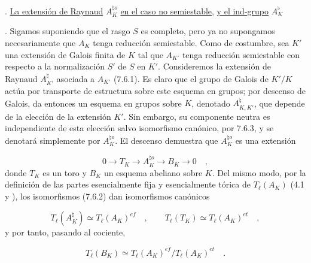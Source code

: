 
\medskip
{}. \underline{La extensión de Raynaud} $A_K^{\natural o}$ \underline{en el caso no
semiestable}, \underline{y el ind-grupo} $A_K^{\flat}$

\medskip
{}. Sigamos suponiendo que el rasgo $S$ es completo, pero ya no
supongamos necesariamente que $A_K$ tenga reducción semiestable. Como
de costumbre, sea $K'$ una extensión de Galois finita de $K$ tal que
$A_{K'}$ tenga reducción semiestable con respecto a la normalización
$S'$ de $S$ en $K'$. Consideremos la extensión de Raynaud
$A_{K'}^{\natural}$ asociada a $A_{K'}$ (7.6.1). Es claro que el grupo
de Galois de $K'/K$ actúa por transporte de estructura sobre este
esquema en grupos; por descenso de Galois, da entonces un esquema en
grupos sobre $K$, denotado $A_{K,K'}^{\natural}$, que depende de la
elección de la extensión $K'$. Sin embargo, su componente neutra es
independiente de esta elección salvo isomorfismo canónico, por 7.6.3, y
se denotará simplemente por $A_K^{\natural o}$. El descenso demuestra
que $A_K^{\natural o}$ es una extensión

\begin{equation}\tag{8.1.1}
0 \longrightarrow T_K \longrightarrow A_K^{\natural o}
 \longrightarrow B_K \longrightarrow 0 \quad ,
\end{equation}
donde $T_K$ es un toro y $B_K$ un esquema abeliano sobre $K$. Del mismo
modo, por la definición de las partes esencialmente fija y esencialmente
tórica de $T_{\ell}(A_K)$ (4.1 y ), los isomorfismos
(7.6.2) dan isomorfismos canónicos

\begin{equation}\tag{8.1.2}
T_{\ell}(A_K^{\natural}) \simeq T_{\ell}(A_K)^{ef} \quad ,
\qquad T_{\ell}(T_K) \simeq T_{\ell}(A_K)^{et} \quad ,
\end{equation}
y por tanto, pasando al cociente,

\begin{equation}\tag{8.1.3}
T_{\ell}(B_K) \simeq
T_{\ell}(A_K)^{ef}/T_{\ell}(A_K)^{et} \quad .
\end{equation}


